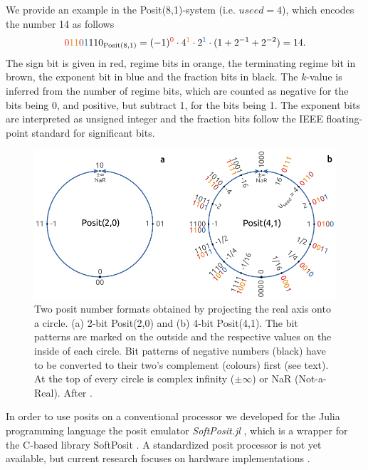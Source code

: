 \documentclass[draft]{agujournal2019}
\newcommand{\op}{\operatorname}
\begin{document}
We provide an example in the Posit(8,1)-system (i.e. $useed = 4$), which encodes the number 14 as follows
\begin{equation}
{\color{psign}0}{\color{pregime}11}{\color{pregimet}0}{\color{pexpo}1}110_{\op{Posit}(8,1)} = (-1)^{\color{psign}0} \cdot 4^{\color{pregime}1} \cdot 2^{\color{pexpo}1} \cdot (1+2^{-1}+2^{-2}) = 14.
\label{eq:posit_pos}
\end{equation}
The sign bit is given in red, regime bits in orange, the terminating regime bit in brown, the exponent bit in blue and the fraction bits in black. The $k$-value is inferred from the number of regime bits, which are counted as negative for the bits being 0, and positive, but subtract 1, for the bits being 1. The exponent bits are interpreted as unsigned integer and the fraction bits follow the IEEE floating-point standard for significant bits.

\begin{figure}[htbp]
\center
\includegraphics[width=1\textwidth]{circles.pdf}
\caption{Two posit number formats obtained by projecting the real axis onto a circle. (a) 2-bit Posit(2,0) and (b) 4-bit Posit(4,1). The bit patterns are marked on the outside and the respective values on the inside of each circle. Bit patterns of negative numbers (black) have to be converted to their two's complement (colours) first (see text). At the top of every circle is complex infinity ($\pm \infty$) or NaR (Not-a-Real). After .}
\label{fig:circle}
\end{figure}

In order to use posits on a conventional processor we developed for the Julia programming language \cite{Bezanson2017} the posit emulator \emph{SoftPosit.jl} \cite{Klower2019a}, which is a wrapper for the C-based library SoftPosit \cite{Leong2020}. A standardized posit processor is not yet available, but current research focuses on hardware implementations \cite{Zhang2020,vanDam2019,Chen2018,Chaurasiya2018,Glaser2017}.
\end{document}
